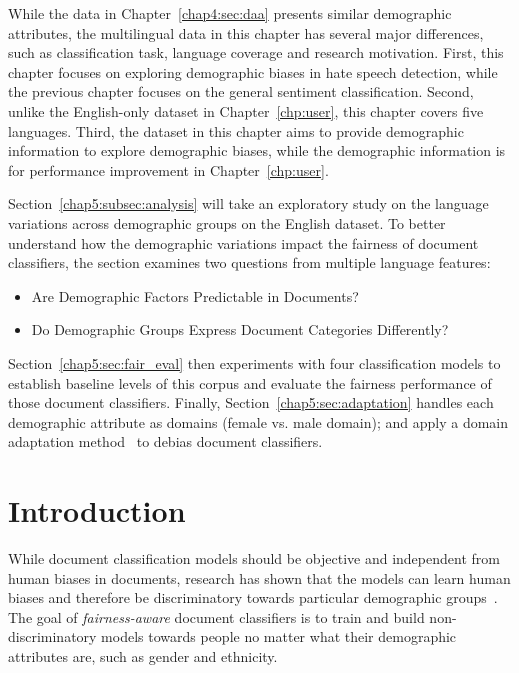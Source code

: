 While the data in Chapter~\ref{chap4:sec:daa} presents similar demographic attributes, the multilingual data in this chapter has several major differences, such as classification task, language coverage and research motivation.
First, this chapter focuses on exploring demographic biases in hate speech detection, while the previous chapter focuses on the general sentiment classification.
Second, unlike the English-only dataset in Chapter~\ref{chp:user}, this chapter covers five languages.
Third, the dataset in this chapter aims to provide demographic information to explore demographic biases, while the demographic information is for performance improvement in Chapter~\ref{chp:user}.

Section~\ref{chap5:subsec:analysis} will take an exploratory study on the language variations across demographic groups on the English dataset.
To better understand how the demographic variations impact the fairness of document classifiers, the section examines two questions from multiple language features:
\begin{itemize}
    \item Are Demographic Factors Predictable in Documents?
    \item Do Demographic Groups Express Document Categories Differently?
\end{itemize}

Section~\ref{chap5:sec:fair_eval} then experiments with four classification models to establish baseline levels of this corpus and evaluate the fairness performance of those document classifiers.
Finally, Section~\ref{chap5:sec:adaptation} handles each demographic attribute as domains (female vs. male domain); and apply a domain adaptation method~\cite{daume2007frustratingly} to debias document classifiers.



\section{Introduction}

While document classification models should be objective and independent from human biases in documents, research has shown that the models can learn human biases and therefore be discriminatory towards particular demographic groups~\cite{dixon2018measuring, borkan2019nuanced, sun2019mitigating}.
The goal of \textit{fairness-aware} document classifiers is to train and build non-discriminatory models towards people no matter what their demographic attributes are, such as gender and ethnicity.

